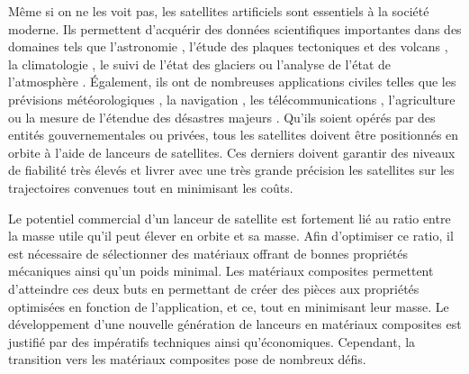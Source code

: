 \label{sec:Introduction}  %

Même si on ne les voit pas, les satellites artificiels sont essentiels à la société moderne. 
Ils permettent d'acquérir des données scientifiques importantes dans des domaines tels que l'astronomie \cite{Freedman2001}, l'étude des plaques tectoniques et des volcans \cite{Christodoulidis1985}, la climatologie \cite{Hollmann2013}, le suivi de l'état des glaciers \cite{Goldstein1993} ou l'analyse de l'état de l'atmosphère \cite{Laube2014}. 
Également, ils ont de nombreuses applications civiles telles que les prévisions météorologiques \cite{Bauer2015}, la navigation \cite{Getting1993}, les télécommunications \cite{Evans2005}, l'agriculture \cite{Lobell2002} ou la mesure de l'étendue des désastres majeurs \cite{Tralli2005}.  
Qu'ils soient opérés par des entités gouvernementales ou privées, tous les satellites doivent être positionnés en orbite à l'aide de lanceurs de satellites. 
Ces derniers doivent garantir des niveaux de fiabilité très élevés et livrer avec une très grande précision les satellites sur les trajectoires convenues tout en minimisant les coûts. 

Le potentiel commercial d'un lanceur de satellite est fortement lié au ratio entre la masse utile qu'il peut élever en orbite et sa masse. 
Afin d'optimiser ce ratio, il est nécessaire de sélectionner des matériaux offrant de bonnes propriétés mécaniques ainsi qu'un poids minimal. 
Les matériaux composites permettent d'atteindre ces deux buts en permettant de créer des pièces aux propriétés optimisées en fonction de l'application, et ce, tout en minimisant leur masse. 
Le développement d'une nouvelle génération de lanceurs en matériaux composites est justifié par des impératifs techniques ainsi qu'économiques. 
Cependant, la transition vers les matériaux composites pose de nombreux défis. 

